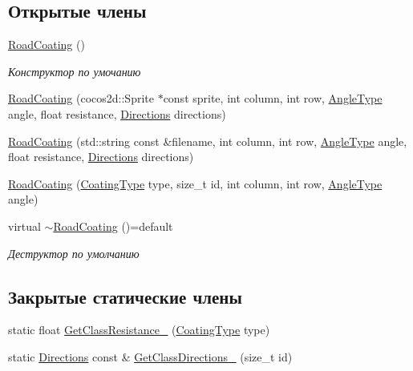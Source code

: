 \subsection*{Открытые члены}
\begin{DoxyCompactItemize}
\item 
\mbox{\label{classrtm_1_1_road_coating_a0069c9e169fd982c4b5a5fa7f00145c6}} 
\hyperlink{classrtm_1_1_road_coating_a0069c9e169fd982c4b5a5fa7f00145c6}{Road\+Coating} ()
\begin{DoxyCompactList}\small\item\em Конструктор по умочанию \end{DoxyCompactList}\item 
\hyperlink{classrtm_1_1_road_coating_a3daed8c05e6901a8e2aedd5bd8b10e88}{Road\+Coating} (cocos2d\+::\+Sprite $\ast$const sprite, int column, int row, \hyperlink{namespacertm_a69dc82b16a0148c10962caa83d930f89}{Angle\+Type} angle, float resistance, \hyperlink{namespacertm_a4776fbfe59834ff1a16838ad6735b69a}{Directions} directions)
\item 
\hyperlink{classrtm_1_1_road_coating_ab127c8e986544a6e8bdf95ed8f302b7e}{Road\+Coating} (std\+::string const \&filename, int column, int row, \hyperlink{namespacertm_a69dc82b16a0148c10962caa83d930f89}{Angle\+Type} angle, float resistance, \hyperlink{namespacertm_a4776fbfe59834ff1a16838ad6735b69a}{Directions} directions)
\item 
\hyperlink{classrtm_1_1_road_coating_a0734f50e7884ed3cad83d0a6a16d663e}{Road\+Coating} (\hyperlink{namespacertm_aecd3929e64cd461eb3555b611f6fad95}{Coating\+Type} type, size\+\_\+t id, int column, int row, \hyperlink{namespacertm_a69dc82b16a0148c10962caa83d930f89}{Angle\+Type} angle)
\item 
\mbox{\label{classrtm_1_1_road_coating_a49f9bc08088af98a0cccdf8db296ba0f}} 
virtual \hyperlink{classrtm_1_1_road_coating_a49f9bc08088af98a0cccdf8db296ba0f}{$\sim$\+Road\+Coating} ()=default
\begin{DoxyCompactList}\small\item\em Деструктор по умолчанию \end{DoxyCompactList}\end{DoxyCompactItemize}
\subsection*{Закрытые статические члены}
\begin{DoxyCompactItemize}
\item 
static float \hyperlink{classrtm_1_1_road_coating_ac5bb86996945090417532dd5af056a24}{Get\+Class\+Resistance\+\_\+} (\hyperlink{namespacertm_aecd3929e64cd461eb3555b611f6fad95}{Coating\+Type} type)
\item 
static \hyperlink{namespacertm_a4776fbfe59834ff1a16838ad6735b69a}{Directions} const  \& \hyperlink{classrtm_1_1_road_coating_ae95e308d1f3998967ca420fa83f2bd93}{Get\+Class\+Directions\+\_\+} (size\+\_\+t id)
\end{DoxyCompactItemize}
